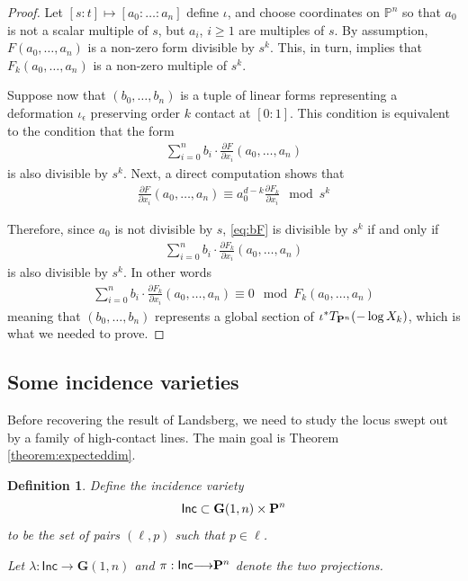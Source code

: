 \documentclass[12pt,reqno]{amsart}
\theoremstyle{plain}
\newtheorem{definition}[theorem]{Definition}
\theoremstyle{remark}
\numberwithin{equation}{section}
\renewcommand{\to}{{\longrightarrow}}
\renewcommand {\P}{{\bf P}}
\numberwithin{equation}{section}
\newcommand{\G}{\mathbf G}
\newcommand{\PP}{\mathbb P}
\begin{document}
\begin{proof}
  Let $[s:t] \mapsto [a_0: \hdots : a_n]$ define $\iota$, and choose coordinates on $\PP^n$ so that
  $a_0$ is not a scalar multiple of $s$, but $a_{i}$, $i \geq 1$ are
  multiples of $s$. By assumption, $F(a_0, \dots, a_n)$ is a non-zero
  form divisible by $s^k$. This, in turn, implies that
  $F_k(a_0, \dots, a_n)$ is a non-zero multiple of $s^k$.

  Suppose now that $(b_0, \dots, b_n)$ is a tuple of linear forms
  representing a deformation $\iota_\epsilon$ preserving order $k$
  contact at $[0:1]$. This condition is equivalent to the condition
  that the form
  \begin{align}
    \label{eq:bF}
    \sum \limits_{i=0}^{n}b_{i} \cdot \frac{\partial F}{\partial x_i}(a_0, \dots, a_n)
  \end{align}
  is also divisible by $s^{k}$.  Next, a direct computation shows that
  \begin{align}
    \label{eq:congruence}
    \frac{\partial F}{\partial x_i}(a_0, \dots, a_n) \equiv a_0^{d-k} \frac{\partial F_{k}}{\partial x_{i}} \mod s^k
  \end{align}

  Therefore, since $a_0$ is not divisible by $s$, \eqref{eq:bF} is
  divisible by $s^k$ if and only if 
  \begin{align}
    \label{eq:bFk}
    \sum \limits_{i=0}^{n}b_{i}\cdot \frac{\partial F_{k}}{\partial x_{i}}(a_0, \dots, a_n)
  \end{align}
  is also divisible by $s^{k}$. In other words
  \begin{align*}
    \sum \limits_{i=0}^{n}b_{i}\cdot \frac{\partial F_{k}}{\partial x_{i}}(a_0, \dots, a_n) \equiv 0 \mod F_k(a_0, \dots, a_n)
  \end{align*}
  meaning that $(b_0, \dots, b_n)$ represents a global section of
  $\iota^{*}T_{\P^{n}}(- \log X_k)$, which is what we needed to prove.
\end{proof}

\subsection{Some incidence varieties}
\label{sec:dimensions}

Before recovering the result of Landsberg, we need to study the locus swept out by a family of high-contact lines. The main goal is Theorem \ref{theorem:expecteddim}.

\begin{definition}
  \label{definition:inc}
  Define the {\sl incidence variety}
  \[\mathsf{Inc} \subset \G(1,n) \times \P^{n}\] to be the set of pairs
  $(\ell,p)$ such that $p \in \ell$.

  Let
  $\lambda: \mathsf{Inc} \to \G(1,n)$ and $\pi: \mathsf{Inc} \to \P^n$
  denote the two projections.
\end{definition}
\end{document}
